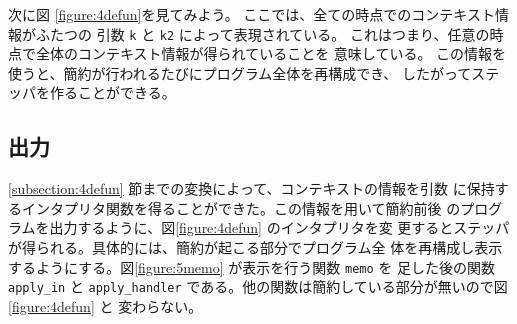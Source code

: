 次に図 \ref{figure:4defun}を見てみよう。
ここでは、全ての時点でのコンテキスト情報がふたつの
引数 \texttt{k} と \texttt{k2} によって表現されている。
これはつまり、任意の時点で全体のコンテキスト情報が得られていることを
意味している。
この情報を使うと、簡約が行われるたびにプログラム全体を再構成でき、
したがってステッパを作ることができる。


\subsection{出力}
\label{subsection:memo}

\ref{subsection:4defun} 節までの変換によって、コンテキストの情報を引数
に保持するインタプリタ関数を得ることができた。この情報を用いて簡約前後
のプログラムを出力するように、図\ref{figure:4defun} のインタプリタを変
更するとステッパが得られる。具体的には、簡約が起こる部分でプログラム全
体を再構成し表示するようにする。図\ref{figure:5memo}
が表示を行う関数 \texttt{memo} を
足した後の関数 \texttt{apply\_in} と \texttt{apply\_handler}
である。他の関数は簡約している部分が無いので図 \ref{figure:4defun} と
変わらない。

